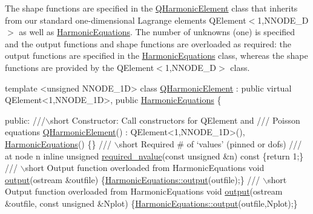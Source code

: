 The shape functions are specified in the {\ttfamily \hyperlink{classQHarmonicElement}{Q\+Harmonic\+Element}} class that inherits from our standard one-\/dimensional Lagrange elements {\ttfamily Q\+Element$<$1,\+N\+N\+O\+D\+E\+\_\+D$>$} as well as {\ttfamily \hyperlink{classHarmonicEquations}{Harmonic\+Equations}}. The number of unknowns (one) is specified and the output functions and shape functions are overloaded as required\+: the output functions are specified in the {\ttfamily \hyperlink{classHarmonicEquations}{Harmonic\+Equations}} class, whereas the shape functions are provided by the {\ttfamily Q\+Element$<$1,\+N\+N\+O\+D\+E\+\_\+D$>$} class.


\begin{DoxyCodeInclude}
\textcolor{keyword}{template} <\textcolor{keywordtype}{unsigned} NNODE\_1D>
\textcolor{keyword}{class }\hyperlink{classQHarmonicElement}{QHarmonicElement} : \textcolor{keyword}{public} \textcolor{keyword}{virtual} QElement<1,NNODE\_1D>, 
                         \textcolor{keyword}{public} \hyperlink{classHarmonicEquations}{HarmonicEquations}
\{
 
  \textcolor{keyword}{public}:
\textcolor{comment}{}
\textcolor{comment}{ ///\(\backslash\)short  Constructor: Call constructors for QElement and }
\textcolor{comment}{ /// Poisson equations}
\textcolor{comment}{} \hyperlink{classQHarmonicElement_a0e7480a0064b51e87ba197551bb10373}{QHarmonicElement}() : QElement<1,NNODE\_1D>(), \hyperlink{classHarmonicEquations}{HarmonicEquations}() \{\}
\textcolor{comment}{}
\textcolor{comment}{ /// \(\backslash\)short  Required  # of `values' (pinned or dofs) }
\textcolor{comment}{ /// at node n}
\textcolor{comment}{} \textcolor{keyword}{inline} \textcolor{keywordtype}{unsigned} \hyperlink{classQHarmonicElement_a8574a452983b15fb2b4d40ec4ef3e890}{required\_nvalue}(\textcolor{keyword}{const} \textcolor{keywordtype}{unsigned} &n)\textcolor{keyword}{ const }\{\textcolor{keywordflow}{return} 1;\}
\textcolor{comment}{}
\textcolor{comment}{ /// \(\backslash\)short Output function overloaded from HarmonicEquations}
\textcolor{comment}{} \textcolor{keywordtype}{void} \hyperlink{classQHarmonicElement_a8b38012f3d62ef419c359f5e545e5f85}{output}(ostream &outfile) 
  \{\hyperlink{classHarmonicEquations_abe34292042ce1394f8979618ee10f354}{HarmonicEquations::output}(outfile);\}
\textcolor{comment}{}
\textcolor{comment}{ ///  \(\backslash\)short Output function overloaded from HarmonicEquations}
\textcolor{comment}{} \textcolor{keywordtype}{void} \hyperlink{classQHarmonicElement_a8b38012f3d62ef419c359f5e545e5f85}{output}(ostream &outfile, \textcolor{keyword}{const} \textcolor{keywordtype}{unsigned} &Nplot) 
  \{\hyperlink{classHarmonicEquations_abe34292042ce1394f8979618ee10f354}{HarmonicEquations::output}(outfile,Nplot);\}



\end{DoxyCodeInclude}
